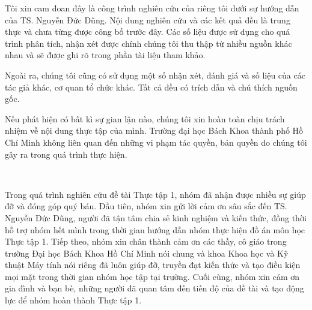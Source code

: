 ﻿\documentclass[12pt,a4paper,oneside]{book} %
\begin{document}

\coverpage

\frontmatter

\begin{declaration}
Tôi xin cam đoan đây là công trình nghiên cứu của riêng tôi dưới sự hướng dẫn của TS. Nguyễn Đức Dũng. Nội dung nghiên cứu và các kết quả đều là trung thực và chưa từng được công bố trước đây. Các số liệu được sử dụng cho quá trình phân tích, nhận xét được chính chúng tôi thu thập từ nhiều nguồn khác nhau và sẽ được ghi rõ trong phần tài liệu tham khảo.

Ngoài ra, chúng tôi cũng có sử dụng một số nhận xét, đánh giá và số liệu của các tác giả khác, cơ quan tổ chức khác. Tất cả  đều có trích dẫn và chú thích nguồn gốc.

Nếu phát hiện có bất kì sự gian lận nào, chúng tôi xin hoàn toàn chịu trách nhiệm về nội dung thực tập của mình. Trường đại học Bách Khoa thành phố Hồ Chí Minh không liên quan đến những vi phạm tác quyền, bản quyền do chúng tôi gây ra trong quá trình thực hiện.

\end{declaration}
~

\begin{acknowledgments}
Trong quá trình nghiên cứu đề tài Thực tập 1, nhóm đã nhận được nhiều sự giúp đỡ và đóng góp quý báu. Đầu tiên, nhóm xin gửi lời cảm ơn sâu sắc đến TS. Nguyễn Đức Dũng, người đã tận tâm chia sẻ kinh nghiệm và kiến thức, đồng thời hỗ trợ nhóm hết mình trong thời gian hướng dẫn nhóm thực hiện đồ án môn học Thực tập 1. Tiếp theo, nhóm xin chân thành cảm ơn các thầy, cô giáo trong trường Đại học Bách Khoa Hồ Chí Minh nói chung và khoa Khoa học và Kỹ thuật Máy tính nói riêng đã luôn giúp đỡ, truyền đạt kiến thức và tạo điều kiện mọi mặt trong thời gian nhóm học tập tại trường. Cuối cùng, nhóm xin cảm ơn gia đình và bạn bè, những người đã quan tâm đến tiến độ của đề tài và tạo động lực để nhóm hoàn thành Thực tập 1.
	
\end{acknowledgments}
~
\end{document}
